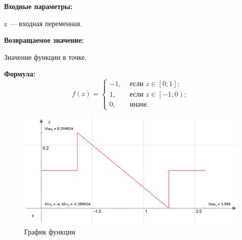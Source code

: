\textbf{Входные параметры:}
 
z --- входная переменная.

\textbf{Возвращаемое значение:}
 
Значение функции в точке.

\textbf{Формула:}
\begin{equation*}
f\left(z \right)=\left\lbrace \begin{aligned} -1,& \text{ если } z \in \left[ 0; 1\right]   ; \\1,& \text{ если } z \in \left[ -1; 0\right) ; \\ 0,& \text{ иначе}. \end{aligned}\right.
\end{equation*}

 \begin{figure} [h] 
   \center
   \includegraphics {HML_DerivativeOfBellShapedKernelParabola_Graph.png}
   \caption{График функции} 
   \label{img:HML_DerivativeOfBellShapedKernelParabola_Graph}  
 \end{figure}